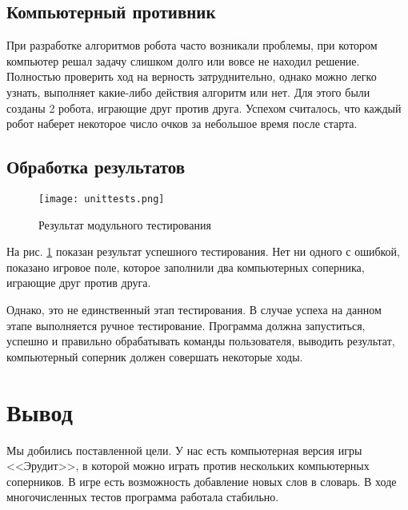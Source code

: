 \documentclass[a4paper,14pt]{article}
\begin{document}
	\subsection{Компьютерный противник}
	При разработке алгоритмов робота часто возникали проблемы, при котором компьютер решал задачу слишком долго или вовсе не находил решение. Полностью проверить ход на верность затруднительно, однако можно легко узнать, выполняет какие-либо действия алгоритм или нет. Для этого были созданы 2 робота, играющие друг против друга. Успехом считалось, что каждый робот наберет некоторое число очков за небольшое время после старта.
	
	\subsection{Обработка результатов}
	\begin{figure}[bhtp]
		\centering
		\caption{Результат модульного тестирования}
		\texttt{[image: unittests.png]}\label{img:tests}
	\end{figure}
	
	На рис. \ref{img:tests} показан результат успешного тестирования. Нет ни одного с ошибкой, показано игровое поле, которое заполнили два компьютерных соперника, играющие друг против друга.
	
	Однако, это не единственный этап тестирования. В случае успеха на данном этапе выполняется ручное тестирование. Программа должна запуститься, успешно и правильно обрабатывать команды пользователя, выводить результат, компьютерный соперник должен совершать некоторые ходы.
	
\section{Вывод}
	Мы добились поставленной цели. У нас есть компьютерная версия игры <<Эрудит>>, в которой можно играть против нескольких компьютерных соперников. В игре есть возможность добавление новых слов в словарь. В ходе многочисленных тестов программа работала стабильно.
\end{document}
